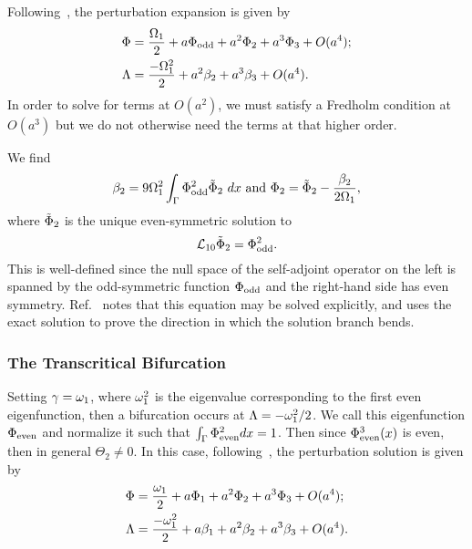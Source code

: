 \documentclass{article}
\numberwithin{equation}{section}
\numberwithin{figure}{section}
\begin{document}
Following~\cite{Marzuola:2017}, the perturbation expansion is given by 
\begin{align*}
\Phi & = \frac{\Omega_1}{2} + a \Phi_{\rm odd} + a^2 \Phi_2 + a^3 \Phi_3 + O(a^4); \\
\Lambda &= \frac{-\Omega_1^2}{2} + a^2 \beta_2 + a^3 \beta_3 + O(a^4).
\end{align*}
In order to solve for terms at $O(a^2)$, we must satisfy a Fredholm condition at $O(a^3)$ but we do not otherwise need the terms at that higher order.

We find 
$$
\beta_2  = 9 \Omega_1^2 \int_{\Gamma} \Phi_{\rm odd}^2 \tilde{\Phi}_2 \ dx \text{ and }
\Phi_2  = \tilde{\Phi}_2 - \frac{\beta_2}{2 \Omega_1},
$$
where $\tilde{\Phi}_2$ is the unique even-symmetric solution to 
$$
\mathcal{L}_{10} \tilde{\Phi}_2 = \Phi_{\rm odd}^2.
$$
This is well-defined since the null space of the self-adjoint operator on the left is spanned by the odd-symmetric function $\Phi_{\rm odd}$ and the right-hand side has even symmetry. Ref.~\cite{Marzuola:2016bl} notes that this equation may be solved explicitly, and uses the exact solution to prove the direction in which the solution branch bends.

\subsubsection{The Transcritical Bifurcation}
\label{sec:transcritical}

Setting $\gamma=\omega_1$, where $\omega_1^2$ is the eigenvalue corresponding to the first even eigenfunction, then a bifurcation occurs at $\Lambda = -\omega_1^2/2$. We call this eigenfunction $\Phi_{\rm even}$ and normalize it such that $\int_{\Gamma} \Phi_{\rm even}^2 dx = 1$. Then since $\Phi_{\rm even}^3(x)$ is even, then in general $\Theta_2\neq0$. In this case, following~\cite{Yang:2012ux}, the perturbation solution is given by 
\begin{align*}
\Phi & = \frac{\omega_1}{2} + a \Phi_1 + a^2 \Phi_2 + a^3 \Phi_3 + O(a^4); \\
\Lambda &= \frac{-\omega_1^2}{2} + a \beta_1 + a^2 \beta_2 + a^3 \beta_3 + O(a^4).
\end{align*}
\end{document}
